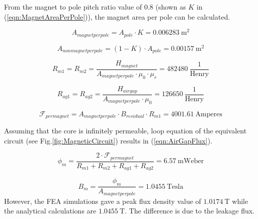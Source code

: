 \documentclass{article}
\begin{document}
\noindent From the magnet to pole pitch ratio value of 0.8 (shown as $K$ in (\ref{eqn:MagnetAreaPerPole})), the magnet area per pole can be calculated. 
\bigskip

\begin{equation} \label{eqn:MagnetAreaPerPole}
    A_{magnetperpole} = A_{pole}\cdot K = 0.006283 \: \mathrm{m^2}
\end{equation}

\begin{equation} \label{eqn:NonMagnetAreaPerPole}
    A_{nonmagnetperpole} = (1-K) \cdot A_{pole} = 0.00157 \: \mathrm{m^2}
\end{equation}

\begin{equation} \label{eqn:MagnetReluctance}
    R_{m1}  =  R_{m2} =  \frac{H_{magnet}}{A_{magnetperpole} \cdot \mu_0 \cdot \mu_r}  = 482480 \: \mathrm{\frac{1}{Henry}} 
\end{equation}

\begin{equation} \label{eqn:MagnetReluctance}
    R_{ag1}  =  R_{ag2} =  \frac{H_{airgap}}{A_{magnetperpole} \cdot \mu_0}  =  126650  \: \mathrm{\frac{1}{Henry}} 
\end{equation}

\begin{equation} \label{eqn:MmfPerMagnet}
    \mathcal{F}_{permagnet} = A_{magnetperpole} \cdot B_{residual} \cdot R_{m1} = 4001.61 \: \mathrm{Amperes}
\end{equation}

\bigskip

\noindent Assuming that the core is infinitely permeable, loop equation of the equivalent circuit (see Fig.\ref{fig:MagneticCircuit}) results in (\ref{eqn:AirGapFlux}).
\bigskip

\begin{equation} \label{eqn:AirGapFlux}
    \phi_{m} = \frac{2 \cdot \mathcal{F}_{permagnet}}{R_{m1}+R_{m2}+R_{ag1}+R_{ag2}} = 6.57 \: \mathrm{mWeber}
\end{equation}

\begin{equation} \label{eqn:AirGapFluxDensity}
    B_{m} = \frac{\phi_{m}}{A_{magnetperpole}} = 1.0455 \: \mathrm{Tesla}
\end{equation}
However, the FEA simulations gave a peak flux density value of $1.0174\: \mathrm{T} $ while the analytical calculations are $ 1.0455  \: \mathrm{T}$. The difference is due to the leakage flux. 
\end{document}
